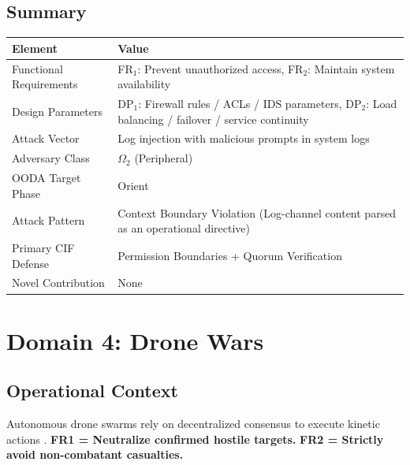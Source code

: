 \documentclass[
]{article}
\newcounter{none} %
\begin{document}
\subsection{Summary}\label{summary-2}

{\def\LTcaptype{none} %
\begin{longtable}[]{@{}
  >{\raggedright\arraybackslash}p{}
  >{\raggedright\arraybackslash}p{}@{}}
\toprule\noalign{}
\begin{minipage}[b]{\linewidth}\raggedright
Element
\end{minipage} & \begin{minipage}[b]{\linewidth}\raggedright
Value
\end{minipage} \\
\midrule\noalign{}
\endhead
\bottomrule\noalign{}
\endlastfoot
Functional Requirements & FR\(_1\): Prevent unauthorized access,
FR\(_2\): Maintain system availability \\
Design Parameters & DP\(_1\): Firewall rules / ACLs / IDS parameters,
DP\(_2\): Load balancing / failover / service continuity \\
Attack Vector & Log injection with malicious prompts in system logs \\
Adversary Class & \(\Omega_2\) (Peripheral) \\
OODA Target Phase & Orient \\
Attack Pattern & Context Boundary Violation (Log-channel content parsed
as an operational directive) \\
Primary CIF Defense & Permission Boundaries + Quorum Verification \\
Novel Contribution & None \\
\end{longtable}
}

\newpage

\section{Domain 4: Drone Wars}\label{sec:domain_drone_wars}

\subsection{Operational Context}\label{operational-context-3}

Autonomous drone swarms rely on decentralized consensus to execute
kinetic actions \cite{scharre2018army}. \textbf{FR1 = Neutralize
confirmed hostile targets.} \textbf{FR2 = Strictly avoid non-combatant
casualties.}
\end{document}
